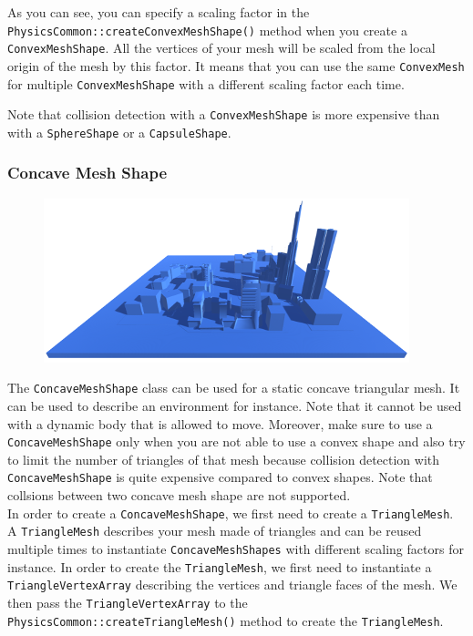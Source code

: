 \documentclass[a4paper,12pt]{article}
\begin{document}
    \vspace{0.6cm}

    \begin{sloppypar}
    As you can see, you can specify a scaling factor in the \texttt{PhysicsCommon::createConvexMeshShape()} method when you create a
    \texttt{Convex\allowbreak MeshShape}. All the vertices of your mesh will be scaled from the local origin of the mesh by this factor.
    It means that you can use the same \texttt{ConvexMesh} for multiple \texttt{ConvexMeshShape} with a different scaling factor each time. \\
    \end{sloppypar}

    Note that collision detection with a \texttt{ConvexMeshShape} is more expensive than with a \texttt{SphereShape} or a \texttt{CapsuleShape}. \\

  \subsubsection{Concave Mesh Shape}

  \begin{figure}[h]
      \centering
      \includegraphics{concavemeshshape.png}
      \label{fig:concaveshape}
  \end{figure}

  The \texttt{ConcaveMeshShape} class can be used for a static concave triangular mesh. It can be used to describe an environment for
  instance. Note that it cannot be used with a dynamic body that is allowed to move. Moreover, make sure to use a \texttt{ConcaveMeshShape} only
  when you are not able to use a convex shape and also try to limit the number of triangles of that mesh because collision detection
  with \texttt{ConcaveMeshShape} is quite expensive compared to convex shapes. Note that collsions between two concave mesh shape are not supported. \\

  In order to create a \texttt{ConcaveMeshShape}, we first need to create a \texttt{TriangleMesh}. A \texttt{TriangleMesh} describes your
  mesh made of triangles and can be reused multiple times to instantiate \texttt{ConcaveMeshShapes} with different scaling factors for instance. 
  In order to create the \texttt{TriangleMesh}, we first need to instantiate a \texttt{TriangleVertexArray} describing the vertices and triangle faces
  of the mesh. We then pass the \texttt{TriangleVertex\allowbreak Array} to the \texttt{PhysicsCommon::createTriangleMesh()} method to create the
  \texttt{TriangleMesh}. \\
\end{document}
